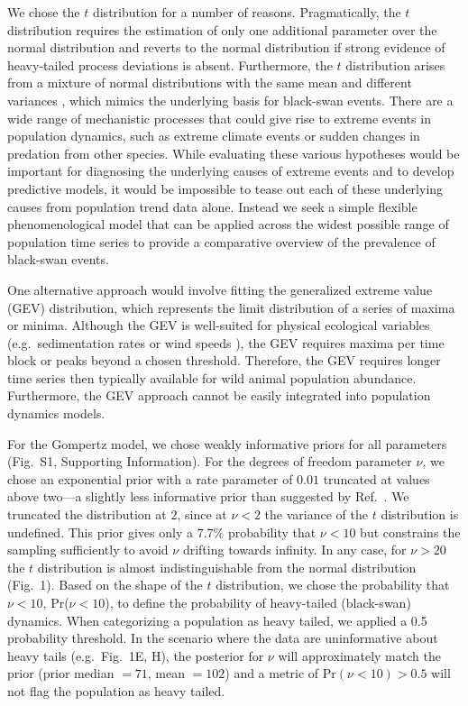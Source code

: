 \documentclass[9pt,twocolumn,twoside]{pnas-new}
\newcommand{\figpriors}{{1}}
\begin{document}
{We chose the $t$ distribution for a number of reasons.
Pragmatically, the $t$ distribution requires the estimation of only one additional
parameter over the normal distribution and reverts to the normal distribution
if strong evidence of heavy-tailed process deviations is absent.
Furthermore, the $t$ distribution arises from a mixture of normal distributions
with the same mean and different variances \cite{gelman2014},
which mimics the underlying basis for black-swan events.
There are a wide range of mechanistic processes
that could give rise to extreme events in population dynamics,
such as extreme climate events
\cite{meehl2004, katz2005, ipcc2012}
or sudden changes in predation from other species.
While evaluating these various hypotheses
would be important for diagnosing the underlying causes
of extreme events and to develop predictive models,
it would be impossible to tease out each of these
underlying causes from population trend data alone.
Instead we seek a simple flexible phenomenological model
that can be applied across the widest possible
range of population time series to provide a
comparative overview of the prevalence
of black-swan events.

One alternative approach would involve fitting
the generalized extreme value (GEV) distribution,
which represents the limit distribution of a series of maxima or minima.
Although the GEV is well-suited for physical ecological variables
(e.g.\ sedimentation rates or wind speeds \cite{gaines1993, denny2009}),
the GEV requires maxima per time block
or peaks beyond a chosen threshold.
Therefore, the GEV requires longer time series then typically available
for wild animal population abundance.
Furthermore, the GEV approach cannot be easily integrated into population dynamics models.

For the Gompertz model,
we chose weakly informative priors for 
all parameters (Fig.~S\figpriors, Supporting Information).
For the degrees of freedom parameter $\nu$, 
we chose an exponential prior 
with a rate parameter
of \(0.01\) truncated at values above two---a slightly less informative prior
than suggested by Ref.~\cite{fernandez1998}. We truncated the
distribution at \(2\), since at \(\nu < 2\) the variance of the $t$ distribution
is undefined. This prior gives only a \(7.7\)\% probability that \(\nu < 10\)
but constrains the sampling sufficiently to avoid \(\nu\) drifting towards infinity. In
any case, for \(\nu > 20\) the $t$ distribution is almost indistinguishable from
the normal distribution (Fig.~1). Based on the shape of the $t$ distribution, we
chose the probability that \(\nu < 10\), Pr(\(\nu < 10\)), to define the
probability of heavy-tailed (black-swan) dynamics. When categorizing a population as heavy
tailed, we applied a 0.5 probability threshold. In the scenario where the data
are uninformative about heavy tails (e.g.~Fig.~1E, H), the posterior for
\(\nu\) will approximately match the prior (prior median \(= 71\), mean \(=
102\)) and a metric of Pr\((\nu < 10) > 0.5\) will not flag the
population as heavy tailed.

}
\end{document}
